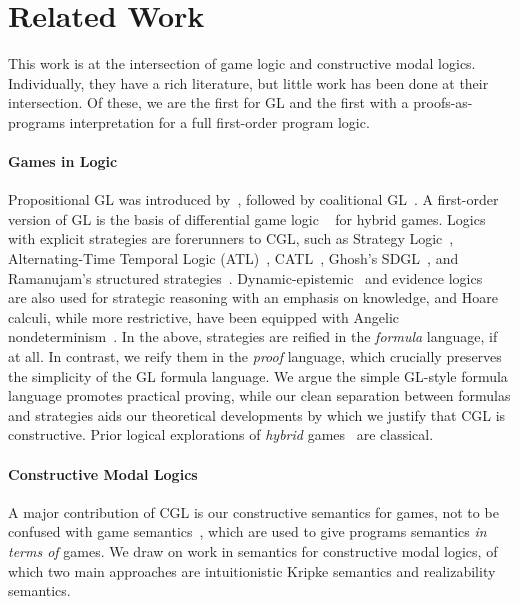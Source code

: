 \documentclass[12pt]{cmuthesis}
\theoremstyle{definition}
\theoremstyle{remark}
\newcommand{\CGL}{\textsf{CGL}\xspace}
\newcommand{\GL}{GL\xspace}
\begin{document}
\section{Related Work}
\newcommand{\semiset}[2]{\{#1~|~#2\}} 
This work is at the intersection of game logic and constructive modal logics.
Individually, they have a rich literature, but little work has been done at their intersection.
Of these, we are the first for \GL and the first with a proofs-as-programs interpretation for a full first-order program logic.

\paragraph{Games in Logic} 
Propositional \GL was introduced by~\cite{DBLP:conf/focs/Parikh83}, followed by coalitional \GL~\cite{DBLP:journals/logcom/Pauly02}.
A first-order version of \GL is the basis of differential game logic \dGL~\cite{DBLP:journals/tocl/Platzer15} for hybrid games.
Logics with explicit strategies are forerunners to \CGL, such as Strategy Logic~\cite{DBLP:conf/concur/ChatterjeeHP07}, Alternating-Time Temporal Logic (ATL)~\cite{DBLP:journals/jacm/AlurHK02}, CATL~\cite{DBLP:conf/atal/HoekJW05}, Ghosh's SDGL~\cite{ghosh2008strategies}, and Ramanujam's structured strategies~\cite{DBLP:conf/kr/RamanujamS08}.
Dynamic-epistemic~\cite{DBLP:series/lncs/Benthem15,DBLP:journals/games/BenthemPR11,van2001games} and evidence logics~\cite{DBLP:journals/sLogica/BenthemP11} are also used for strategic reasoning with an emphasis on knowledge, and Hoare calculi, while more restrictive, have been equipped with Angelic nondeterminism~\cite{DBLP:journals/corr/Mamouras16}.
In the above, strategies are reified in the \emph{formula} language, if at all.
In contrast, we reify them in the \emph{proof} language, which crucially preserves the simplicity of the \GL formula language.
We argue the simple \GL-style formula language promotes practical proving, while our clean separation between formulas and strategies aids our theoretical developments by which we justify that \CGL is constructive.
Prior logical explorations of \emph{hybrid} games~\cite{DBLP:conf/cade/QueselP12,DBLP:journals/tocl/Platzer15,DBLP:journals/tocl/Platzer17,DBLP:conf/cade/Platzer18} are classical.

\paragraph{Constructive Modal Logics}
A major contribution of \CGL is our constructive semantics for games, not to be confused with game semantics~\cite{DBLP:journals/iandc/AbramskyJM00}, which are used to give programs semantics \emph{in terms of} games.
We draw on work in semantics for constructive modal logics, of which two main approaches are intuitionistic Kripke semantics and realizability semantics.
\end{document}
